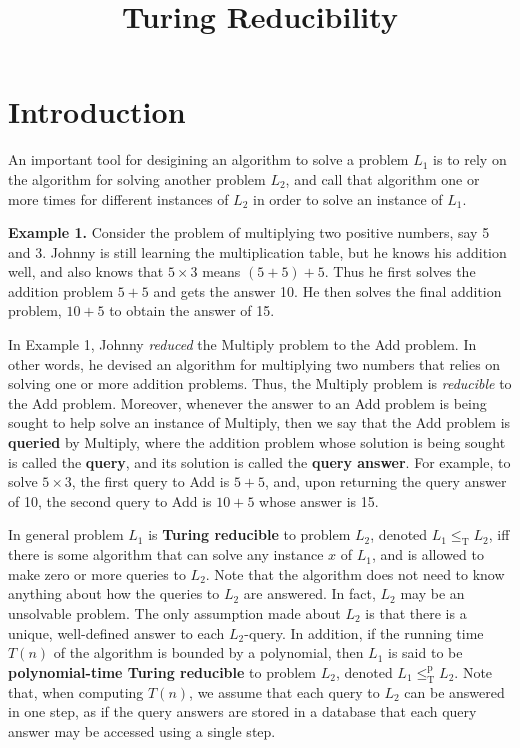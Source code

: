 \documentclass [12pt]{article}
\title{Turing Reducibility}
\author{}
\date{}
\theoremstyle{definition}
\begin{document}
\maketitle

\normalsize

\section*{Introduction}

An important tool for desigining an algorithm to solve a problem $L_{1}$ is to rely on the algorithm for solving another problem $L_{2}$, and call that algorithm one or more times for different instances of
$L_{2}$ in order to solve an instance of $L_{1}$.

\textbf{Example 1.} Consider the problem of multiplying two positive numbers, say 5 and 3. Johnny is still learning the multiplication table, but he knows his addition well, and
also knows that $5\times 3$ means $(5+5)+5$.
Thus he first solves the addition problem $5+5$ and gets the answer 10. He then solves the final addition problem, $10+5$ to obtain the answer of 15.

In Example 1, Johnny \textit{reduced} the Multiply problem to the Add problem. In other words, he devised an algorithm for multiplying two numbers that relies on solving one or more addition 
problems. Thus, the  Multiply problem is \textit{reducible} to the Add problem. Moreover, whenever the answer to an Add problem is being sought to help solve an instance of Multiply, then
we say that the Add problem is \textbf{queried} by Multiply, where the addition problem whose solution is being sought is called the \textbf{query}, and its solution is called the \textbf{query answer}.
For example, to solve $5\times 3$, the first query to Add is $5+5$, and, upon returning the query answer of 10, the second query to Add is $10+5$ whose answer is 15.

In general problem $L_{1}$ is \textbf{Turing reducible} to problem $L_{2}$, denoted
$L_{1}\leq_{\mbox{T}}L_{2}$, iff there is some algorithm that can solve any instance $x$ of $L_{1}$, and is allowed to make zero or more queries to $L_{2}$. Note that the algorithm does not need to know
anything about how the queries to $L_{2}$ are answered. In fact, $L_{2}$ may be an unsolvable problem. The only assumption made about $L_{2}$
is that there is a unique, well-defined answer to each $L_{2}$-query. In addition, if the running time $T(n)$ of the algorithm is bounded by a polynomial, then 
$L_{1}$ is said to be \textbf{polynomial-time Turing reducible} to problem $L_{2}$, denoted $L_{1}\leq_{\mbox{T}}^{\mbox{p}}L_{2}$. Note that, when computing $T(n)$, we assume that each query 
to $L_{2}$ can be answered in one step, as if the query answers are stored in a database that each query answer may be accessed using a single step.
\end{document}
